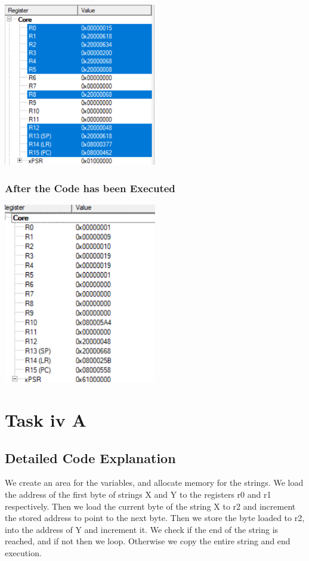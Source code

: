 \documentclass{article}
\begin{document}
\begin{center}
    \includegraphics[width=0.5\textwidth]{task_iii_B_before.png}
\end{center}

\subsubsection{After the Code has been Executed}

\begin{center}
    \includegraphics[width=0.5\textwidth]{task_iii_B_after.png}
\end{center}

\section{Task iv A}

\subsection{Detailed Code Explanation}
We create an area for the variables, and allocate memory for the strings. We load the address of the first byte of strings X and Y to the registers r0 and r1 respectively. Then we load the current byte of the string X to r2 and increment the stored address to point to the next byte. Then we store the byte loaded to r2, into the address of Y and increment it. We check if the end of the string is reached, and if not then we loop. Otherwise we copy the entire string and end execution.
\end{document}
